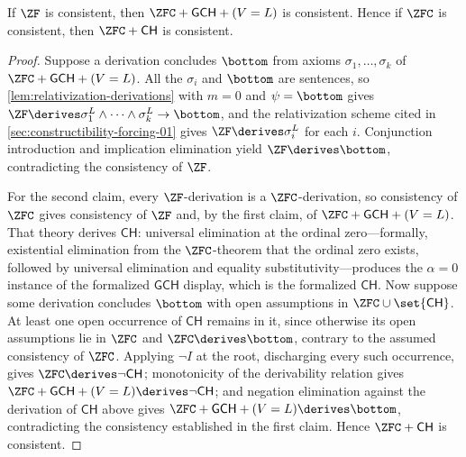 \begin{theorem}
\label{thm:ch-relative-consistency}
If \(\ZF\) is consistent, then \(\ZFC+\mathsf{GCH}+(V=L)\) is consistent.
Hence if \(\ZFC\) is consistent, then \(\ZFC+\mathsf{CH}\) is consistent.
\end{theorem}

\begin{proof}
Suppose a derivation concludes \(\bottom\) from axioms
\(\sigma_1,\ldots,\sigma_k\) of \(\ZFC+\mathsf{GCH}+(V=L)\).  All the
\(\sigma_i\) and \(\bottom\) are sentences, so
\cref{lem:relativization-derivations} with \(m=0\) and \(\psi=\bottom\)
gives
\(\ZF\derives\sigma_1^{L}\land\cdots\land\sigma_k^{L}\to\bottom\), and the
relativization scheme cited in \cref{sec:constructibility-forcing-01}
gives \(\ZF\derives\sigma_i^{L}\) for each \(i\).  Conjunction
introduction and implication elimination yield \(\ZF\derives\bottom\),
contradicting the consistency of \(\ZF\).

For the second claim, every \(\ZF\)-derivation is a \(\ZFC\)-derivation,
so consistency of \(\ZFC\) gives consistency of \(\ZF\) and, by the first
claim, of \(\ZFC+\mathsf{GCH}+(V=L)\).  That theory derives
\(\mathsf{CH}\): universal elimination at the ordinal zero---formally,
existential elimination from the \(\ZFC\)-theorem that the ordinal zero
exists, followed by universal elimination and equality
substitutivity---produces the \(\alpha=0\) instance of the formalized
\(\mathsf{GCH}\) display, which is the formalized \(\mathsf{CH}\).  Now
suppose some derivation concludes \(\bottom\) with open assumptions in
\(\ZFC\cup\set{\mathsf{CH}}\).  At least one open occurrence of
\(\mathsf{CH}\) remains in it, since otherwise its open assumptions lie in
\(\ZFC\) and \(\ZFC\derives\bottom\), contrary to the assumed consistency
of \(\ZFC\).  Applying \(\neg I\) at the root, discharging every such
occurrence, gives \(\ZFC\derives\neg\mathsf{CH}\); monotonicity of the
derivability relation gives
\(\ZFC+\mathsf{GCH}+(V=L)\derives\neg\mathsf{CH}\); and negation
elimination against the derivation of \(\mathsf{CH}\) above gives
\(\ZFC+\mathsf{GCH}+(V=L)\derives\bottom\), contradicting the consistency
established in the first claim.  Hence \(\ZFC+\mathsf{CH}\) is
consistent.
\end{proof}

